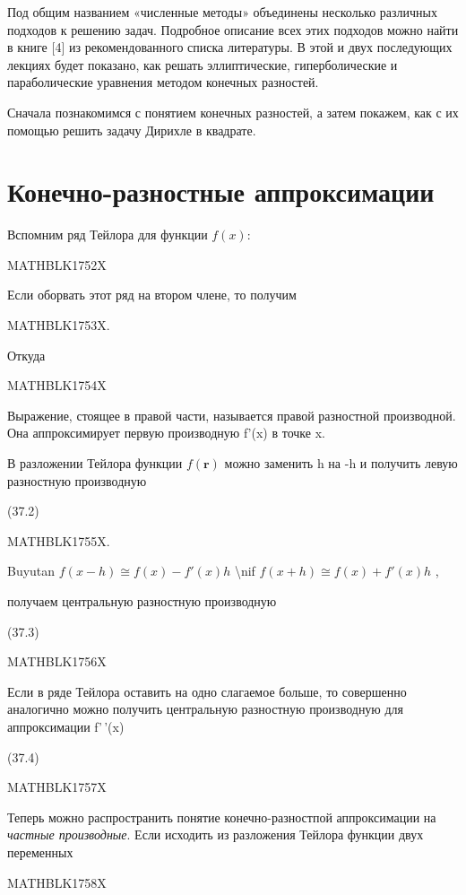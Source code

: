 \documentclass[
]{article}
\begin{document}
{{{Под общим названием «численные методы» объединены несколько различных
подходов к решению задач. Подробное описание всех этих подходов можно
найти в книге {[}4{]} из рекомендованного списка литературы. В этой и
двух последующих лекциях будет показано, как решать эллиптические,
гиперболические и параболические уравнения методом конечных разностей.

Сначала познакомимся с понятием конечных разностей, а затем покажем, как
с их помощью решить задачу Дирихле в квадрате.

\section{Конечно-разностные
аппроксимации}\label{ux43aux43eux43dux435ux447ux43dux43e-ux440ux430ux437ux43dux43eux441ux442ux43dux44bux435-ux430ux43fux43fux440ux43eux43aux441ux438ux43cux430ux446ux438ux438}

Вспомним ряд Тейлора для функции \(f(x)\):

MATHBLK1752X

Если оборвать этот ряд на втором члене, то получим

MATHBLK1753X.

Откуда

MATHBLK1754X

Выражение, стоящее в правой части, называется правой разностной
производной. Она аппроксимирует первую производную f'(x) в точке x.

В разложении Тейлора функции \(f(\mathbf{r})\) можно заменить h на -h и
получить левую разностную производную

(37.2)

MATHBLK1755X.

Buyutan \(f(x - h) \cong f(x) - f'(x) h\) \textbackslash nif
\(f(x + h) \cong f( x) + f'(x) h\) ,

получаем центральную разностную производную

(37.3)

MATHBLK1756X

Если в ряде Тейлора оставить на одно слагаемое больше, то совершенно
аналогично можно получить центральную разностную производную для
аппроксимации f'\,'(x)

(37.4)

MATHBLK1757X

Теперь можно распространить понятие конечно-разностпой аппроксимации на
\emph{частные производные}. Если исходить из разложения Тейлора функции
двух переменных

MATHBLK1758X

}}}
\end{document}
